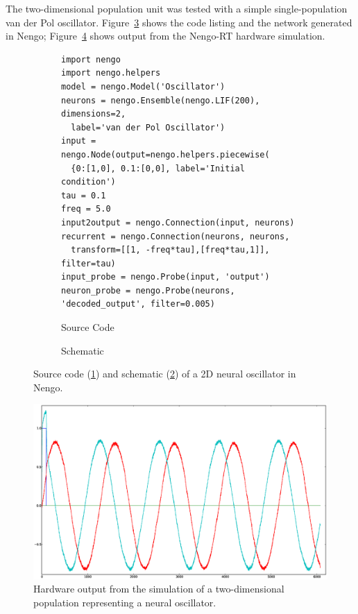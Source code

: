 \documentclass[english]{article}
\newcommand{\design}{Nengo-RT}
\begin{document}
The two-dimensional population unit was tested with a simple single-population van der Pol oscillator.
Figure~\ref{lst:oscillator2d} shows the code listing and the network generated in Nengo;
Figure~\ref{fig:oscillator2d} shows output from the \design{} hardware simulation.
\begin{figure}
\centering

\begin{subfigure}[b]{\textwidth}
\centering
\lstset{language=Python}
\begin{lstlisting}[frame=single]
import nengo
import nengo.helpers
model = nengo.Model('Oscillator')
neurons = nengo.Ensemble(nengo.LIF(200), dimensions=2, 
  label='van der Pol Oscillator')
input = nengo.Node(output=nengo.helpers.piecewise(
  {0:[1,0], 0.1:[0,0], label='Initial condition')
tau = 0.1
freq = 5.0
input2output = nengo.Connection(input, neurons)
recurrent = nengo.Connection(neurons, neurons, 
  transform=[[1, -freq*tau],[freq*tau,1]], filter=tau)
input_probe = nengo.Probe(input, 'output')
neuron_probe = nengo.Probe(neurons, 'decoded_output', filter=0.005)
\end{lstlisting}
\caption{Source Code}
\label{lst:oscillator2d:code}
\end{subfigure}

\begin{subfigure}[b]{0.3\textwidth}
\centering
\caption{Schematic}
\label{lst:oscillator2d:schematic}
\end{subfigure}

\caption[A 2D neural oscillator in Nengo.]
{Source code (\ref{lst:oscillator2d:code}) and schematic (\ref{lst:oscillator2d:schematic})
of a 2D neural oscillator in Nengo.}
\label{lst:oscillator2d}
\end{figure}

\begin{figure}
\centering
\includegraphics[width=6in]{oscillator-2d.eps}

\caption[Simulation of a 2D neural oscillator.]
{Hardware output from the simulation of a two-dimensional population representing a neural oscillator.}
\label{fig:oscillator2d}
\end{figure}
\end{document}
